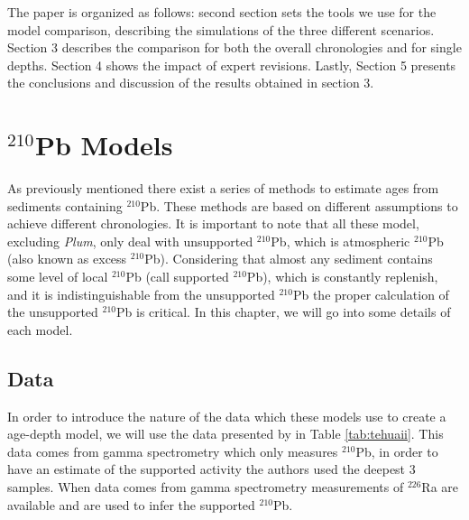 \documentclass [10pt] {article}
\begin{document}
The paper is organized as follows: second section sets the tools we use for the model comparison, describing the simulations of the three different scenarios.
Section 3 describes the comparison for both the overall chronologies and for single depths.
Section 4 shows the impact of expert revisions.
Lastly, Section 5 presents the conclusions and discussion of the results obtained in section 3. 

\section{$^{210}$Pb Models}

As previously mentioned there exist a series of methods to estimate ages from sediments containing $^{210}$Pb.  
These methods are based on different assumptions to achieve different chronologies. 
It is important to note that all these model, excluding \textit{Plum}, only deal with unsupported $^{210}$Pb, which is atmospheric $^{210}$Pb (also known as excess $^{210}$Pb). 
Considering that almost any sediment contains some level of local $^{210}$Pb (call supported $^{210}$Pb), which is constantly replenish, and it is indistinguishable from the unsupported $^{210}$Pb the proper calculation of the unsupported $^{210}$Pb is critical.  
In this chapter, we will go into some details of each model.

\subsection{Data}

In order to introduce the nature of the data which these models use to create a age-depth model, we will use the data presented by  \citet{Sanchez-Cabeza2012} in Table \ref{tab:tehuaii}.
This data comes from gamma spectrometry which only measures $^{210}$Pb, in order to have an estimate of the supported activity the authors used the deepest 3 samples. When data comes from gamma spectrometry measurements of $^{226}$Ra are available and are used to infer the supported $^{210}$Pb.
\end{document}
